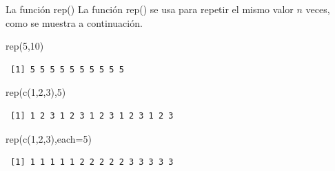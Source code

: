 \documentclass[
  ignorenonframetext,
  aspectratio=169,
  spanish,
]{beamer}
\newenvironment{Shaded}{\begin{snugshade}}{\end{snugshade}}
\newcommand{\AttributeTok}[1]{\textcolor[rgb]{0.40,0.45,0.13}{#1}}
\newcommand{\DecValTok}[1]{\textcolor[rgb]{0.68,0.00,0.00}{#1}}
\newcommand{\FunctionTok}[1]{\textcolor[rgb]{0.28,0.35,0.67}{#1}}
\newcommand{\NormalTok}[1]{\textcolor[rgb]{0.00,0.23,0.31}{#1}}
\begin{document}
\begin{frame}[fragile]{La función rep()}
\label{la-funciuxf3n-rep}
La función rep() se usa para repetir el mismo valor \(n\) veces, como se
muestra a continuación.

\begin{Shaded}
\begin{Highlighting}[]
\FunctionTok{rep}\NormalTok{(}\DecValTok{5}\NormalTok{,}\DecValTok{10}\NormalTok{)}
\end{Highlighting}
\end{Shaded}

\begin{verbatim}
 [1] 5 5 5 5 5 5 5 5 5 5
\end{verbatim}

\begin{Shaded}
\begin{Highlighting}[]
\FunctionTok{rep}\NormalTok{(}\FunctionTok{c}\NormalTok{(}\DecValTok{1}\NormalTok{,}\DecValTok{2}\NormalTok{,}\DecValTok{3}\NormalTok{),}\DecValTok{5}\NormalTok{)}
\end{Highlighting}
\end{Shaded}

\begin{verbatim}
 [1] 1 2 3 1 2 3 1 2 3 1 2 3 1 2 3
\end{verbatim}

\begin{Shaded}
\begin{Highlighting}[]
\FunctionTok{rep}\NormalTok{(}\FunctionTok{c}\NormalTok{(}\DecValTok{1}\NormalTok{,}\DecValTok{2}\NormalTok{,}\DecValTok{3}\NormalTok{),}\AttributeTok{each=}\DecValTok{5}\NormalTok{) }
\end{Highlighting}
\end{Shaded}

\begin{verbatim}
 [1] 1 1 1 1 1 2 2 2 2 2 3 3 3 3 3
\end{verbatim}
\end{frame}
\end{document}
